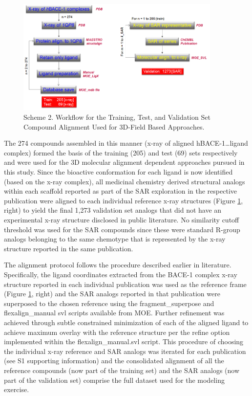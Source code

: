 \begin{figure}
  \centering
  \includegraphics[width=0.9\textwidth]{Images/bace_scheme2.png}
  \caption{Scheme 2. Workflow for the Training, Test, and Validation Set Compound Alignment Used for 3D-Field Based Approaches.}
  \label{fig:bace_scheme2}
\end{figure}

The 274 compounds assembled in this manner (x-ray of aligned hBACE-1…ligand complex) formed the basis of the training (205) and test (69) sets respectively and were used for the 3D molecular alignment dependent approaches pursued in this study.  Since the bioactive conformation for each ligand is now identified (based on the x-ray complex), all medicinal chemistry derived structural analogs within each scaffold reported as part of the SAR exploration in the respective publication were aligned to each individual reference x-ray structures (Figure \ref{fig:bace_scheme2}, right) to yield the final 1,273 validation set analogs that did not have an experimental x-ray structure disclosed in public literature.  No similarity cutoff threshold was used for the SAR compounds since these were standard R-group analogs belonging to the same chemotype that is represented by the x-ray structure reported in the same publication.

The alignment protocol follows the procedure described earlier in literature. \cite{subramanian2012integrated}  Specifically, the ligand coordinates extracted from the BACE-1 complex x-ray structure reported in each individual publication was used as the reference frame (Figure \ref{fig:bace_scheme2}, right) and the SAR analogs reported in that publication were superposed to the chosen reference using the fragment\_superpose and flexalign\_manual svl scripts available from MOE.  Further refinement was achieved through subtle constrained minimization of each of the aligned ligand to achieve maximum overlay with the reference structure per the refine option implemented within the flexalign\_manual.svl script.  This procedure of choosing the individual x-ray reference and SAR analogs was iterated for each publication (see S1 supporting information) and the consolidated alignment of all the reference compounds (now part of the training set) and the SAR analogs (now part of the validation set) comprise the full dataset used for the modeling exercise. 

